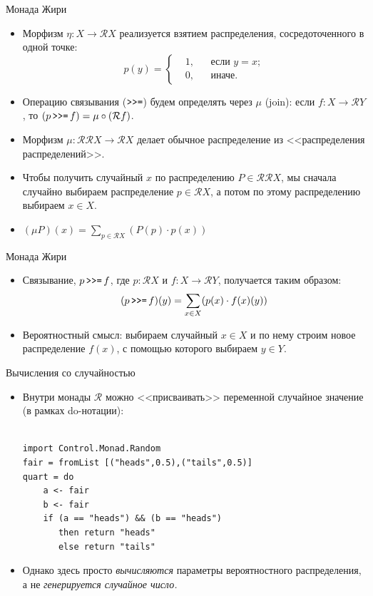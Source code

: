 \documentclass[xcolor=dvipsnames]{beamer}
\newcommand{\bind}{\mathop{\mbox{\tt {>}>=}}}
\newcommand{\Rc}{\mathcal{R}}
\begin{document}
\begin{frame}{Монада Жири}
 
 \begin{itemize}[<+->]
  \item Морфизм $\eta \colon X \to \Rc X$ реализуется взятием распределения, сосредоточенного в одной точке:
\[
 p(y) = \left\{ \begin{aligned}
       & 1, && \mbox{если $y = x$;}\\
       & 0, && \mbox{иначе.}
                \end{aligned}
\right.
\]
  \item Операцию связывания ($\bind$) будем определять через $\mu$ (join): если $f \colon X \to \Rc Y$, то $(p \bind f) = \mu \circ (\Rc f)$. 
  \item Морфизм $\mu \colon \Rc\Rc X \to \Rc X$ делает обычное распределение из <<распределения распределений>>.
  \item Чтобы получить случайный $x$ по распределению $P \in \Rc \Rc X$,  мы сначала случайно выбираем распределение $p \in \Rc X$, а потом по этому распределению выбираем $x \in X$.
  \item $(\mu P)(x) = \sum\limits_{p \in \Rc X} (P(p) \cdot p(x))$
  \end{itemize}


\end{frame}

\begin{frame}{Монада Жири}
 
 \begin{itemize}[<+->]
  \item Связывание, $p \bind f$, где $p : \Rc X$ и $f : X \to \Rc Y$, получается таким образом:
  \[
   (p \bind f) (y) = \sum_{x \in X} (p(x) \cdot f(x)(y))
  \]
  \item Вероятностный смысл: выбираем случайный $x \in X$ и по нему строим новое распределение $f(x)$, с помощью которого выбираем $y \in Y$.
 \end{itemize}

\end{frame}


\begin{frame}[fragile]{Вычисления со случайностью}

\begin{itemize}[<+->]
 \item Внутри монады $\Rc$ можно <<присваивать>> переменной случайное значение (в рамках do-нотации):
 \begin{verbatim}
 
import Control.Monad.Random
fair = fromList [("heads",0.5),("tails",0.5)]
quart = do
    a <- fair
    b <- fair
    if (a == "heads") && (b == "heads") 
       then return "heads"
       else return "tails"
 \end{verbatim}
\item Однако здесь просто {\em вычисляются} параметры вероятностного распределения, а не {\em генерируется случайное число.}
\end{itemize}

 
\end{frame}
\end{document}
